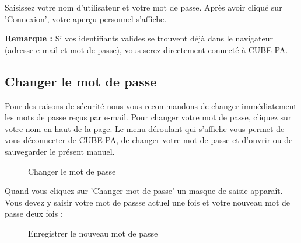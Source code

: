 Saisissez votre nom d'utilisateur et votre mot de passe. Après avoir cliqué sur 'Connexion', votre aperçu personnel s'affiche.

\vspace{\baselineskip}

\textbf{Remarque :} Si vos identifiants valides se trouvent déjà dans le navigateur (adresse e-mail et mot de passe), vous serez directement connecté à CUBE PA.

\subsection{Changer le mot de passe}
\label{bkm:Ref434828103}

Pour des raisons de sécurité nous vous recommandons de changer immédiatement les mots de passe reçus par e-mail. Pour changer votre mot de passe, cliquez sur votre nom en haut de la page. Le menu déroulant qui s'affiche vous permet de vous déconnecter de CUBE PA, de changer votre mot de passe et d'ouvrir ou de sauvegarder le présent manuel.

\begin{figure}[H]
\caption{Changer le mot de passe}
\end{figure}

Quand vous cliquez sur 'Changer mot de passe' un masque de saisie apparaît. Vous devez y saisir votre mot de passse actuel une fois et votre nouveau mot de passe deux fois :

\begin{figure}[H]
\caption{Enregistrer le nouveau mot de passe}
\end{figure}

